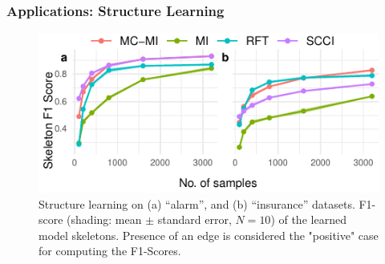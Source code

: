 \documentclass{beamer}
\begin{document}
\begin{frame}
	\frametitle{Applications: Structure Learning}
	\begin{figure}
		\centering
		\includegraphics{imgs/sl.pdf}
		\caption{Structure learning on (a) ``alarm'', and (b)
		``insurance'' datasets.  F1-score (shading: mean $\pm$ standard
		error, $N=10$) of the learned model skeletons.  Presence of an
		edge is considered the "positive" case for computing the
		F1-Scores.}
	\end{figure}
\end{frame}
\end{document}
